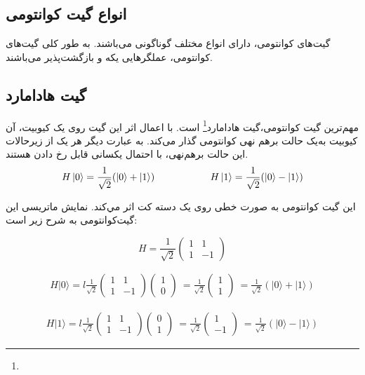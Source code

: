 \documentclass{book}
\begin{document}
\subsection{انواع گیت کوانتومی}
گیت‌های کوانتومی، دارای انواع مختلف گوناگونی می‌باشند. به طور کلی گیت‌های کوانتومی، عملگر‌هایی یکه و بازگشت‌پذیر می‌باشند. 
\subsection*{گیت هادامارد}
مهم‌ترین گیت کوانتومی،‌گیت هادامارد\footnote{} است. با اعمال اثر این گیت روی یک کیوبیت، آن کیوبیت به‌یک حالت برهم نهی‌ کوانتومی‌ گذار‌ می‌کند. به عبارت دیگر هر یک از زیرحالات این حالت برهم‌نهی، با احتمال یکسانی قابل رخ دادن‌ هستند. 
\vspace{1cm}
$$
H\ket{0} = \frac{1}{\sqrt{2}} (\ket{0} + \ket{1})
\hspace{2cm}
H\ket{1} = \frac{1}{\sqrt{2}} (\ket{0} - \ket{1})
$$
\vspace{1cm}

این گیت کوانتومی‌ به صورت خطی روی یک دسته‌ کت اثر مي‌کند. نمایش ماتریسی این گیت‌کوانتومی به شرح زیر است:
\begin{center}
	\[
	H = \frac{1}{\sqrt{2}}
	\begin{pmatrix}
		1 & 1 \\
		1 & -1
	\end{pmatrix}
	\]
\end{center}





\begin{align*}
	H |0\rangle = l\frac{1}{\sqrt{2}} \begin{pmatrix} 1 & 1 \\ 1 & -1 \end{pmatrix} \begin{pmatrix} 1 \\ 0 \end{pmatrix} \
	= \frac{1}{\sqrt{2}} \begin{pmatrix} 1 \\ 1 \end{pmatrix} \
	= \frac{1}{\sqrt{2}} (|0\rangle + |1\rangle)
\end{align*}

\begin{align*}
	H |1\rangle = l\frac{1}{\sqrt{2}} \begin{pmatrix} 1 & 1 \\ 1 & -1 \end{pmatrix} \begin{pmatrix} 0 \\ 1 \end{pmatrix} \
	= \frac{1}{\sqrt{2}} \begin{pmatrix} 1 \\ -1 \end{pmatrix} \
	= \frac{1}{\sqrt{2}} (|0\rangle - |1\rangle)
\end{align*}
\end{document}
